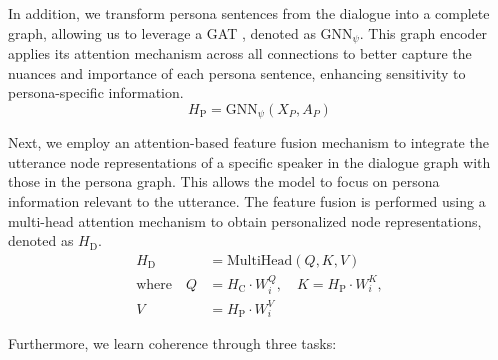 \documentclass[letterpaper]{article} %
\begin{document}
In addition, we transform persona sentences from the dialogue into a complete graph, allowing us to leverage a GAT \cite{brody-etal-2022-gatv2}, denoted as $\text{GNN}_{\psi}$. This graph encoder applies its attention mechanism across all connections to better capture the nuances and importance of each persona sentence, enhancing sensitivity to persona-specific information.
\begin{equation}
H_{\text{P}} = \text{GNN}_{\psi}(X_{P}, A_{P})
\end{equation}

Next, we employ an attention-based feature fusion mechanism to integrate the utterance node representations of a specific speaker in the dialogue graph with those in the persona graph. This allows the model to focus on persona information relevant to the utterance. The feature fusion is performed using a multi-head attention mechanism to obtain personalized node representations, denoted as $H_{\text{D}}$.
\begin{equation}
\begin{aligned}
    H_{\text{D}} &= \text{MultiHead}(Q,K,V) \\
    \text{where} \quad 
    Q &= H_{\text{C}} \cdot W^Q_i, \quad
    K = H_{\text{P}} \cdot W^K_i, \\
    V &= H_{\text{P}} \cdot W^V_i
\end{aligned}
\end{equation}

Furthermore, we learn coherence through three tasks:
\end{document}
